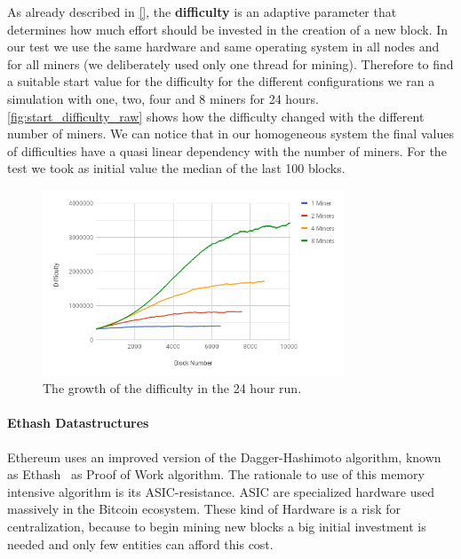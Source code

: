 As already described in \autoref{}, the \textbf{difficulty} is an adaptive
parameter  that determines how much effort should be invested in the creation
of a new block. In our test we use the same hardware and same operating system 
in all nodes and for all miners (we deliberately used only one thread for 
mining). Therefore to find a suitable start value for the difficulty for the
different configurations we ran a simulation with one, two, four and 8 miners
for 24 hours.
\autoref{fig:start_difficulty_raw} shows how the difficulty changed with
the different number of miners. We can notice that in our homogeneous system
the final values of difficulties have a quasi linear dependency with the number
of miners. For the test we took as initial value the median of the last 100
blocks.
\begin{figure}
	\begin{center}

		\includegraphics[width=0.8\textwidth]{./res/img/start_difficulty_all.png}
		\caption{The growth of the difficulty in the 24 hour run.}
		\label{fig:start_difficulty_raw}
		
	\end{center}
\end{figure}

\paragraph{Ethash Datastructures} Ethereum uses an improved version of the
Dagger-Hashimoto algorithm, known as 
Ethash~\cite[Appendix J]{wood2018ethereum} as Proof of Work algorithm.
The rationale to use of this memory intensive algorithm is its 
ASIC-resistance. ASIC are specialized hardware used massively in the Bitcoin
ecosystem. These kind of Hardware is a risk for centralization, 
because to begin mining new blocks a big initial investment is needed and
only few entities can afford this cost.

